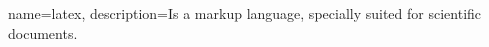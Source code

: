 {
    name=latex,
    description={Is a markup language, specially suited for scientific documents.}
}

